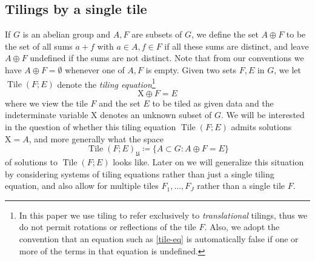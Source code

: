 \documentclass[reqno,a4paper,12pt]{amsart}
\numberwithin{equation}{section}
\numberwithin{figure}{section}
\newcommand\X{\mathrm{X}}
\newcommand{\Tile}{\operatorname{Tile}}
\newcommand{\Universe}{{\mathfrak{U}}}
\theoremstyle{plain}
\theoremstyle{definition}
\begin{document}
\subsection{Tilings by a single tile}

If $G$ is an abelian group and $A,F$ are subsets of $G$, we define the set $A \oplus F$ to be the set of all sums $a+f$ with $a \in A, f \in F$ if all these sums are distinct, and leave $A \oplus F$ undefined if the sums are not distinct.  Note that from our conventions we have $A \oplus F = \emptyset$ whenever one of $A,F$ is empty.  Given two sets $F, E$ in $G$, we let $\Tile(F; E)$ denote the \emph{tiling equation}\footnote{In this paper we use tiling to refer exclusively to \emph{translational} tilings, thus we do not permit rotations or reflections of the tile $F$. Also, we adopt the convention that an equation such as \eqref{tile-eq} is automatically false if one or more of the terms in that equation is undefined.}
\begin{equation}\label{tile-eq}
\X \oplus F = E
\end{equation}
where we view the tile $F$ and the set $E$ to be tiled as given data and the indeterminate variable $\X$ denotes an unknown subset of $G$.  We will be interested in the question of whether this tiling equation $\Tile(F;E)$ admits solutions $\X = A$, and more generally what the space 
$$ \Tile(F;E)_{\Universe} \coloneqq \{ A \subset G: A \oplus F = E \}$$ 
of solutions to $\Tile(F;E)$ looks like.  Later on we will generalize this situation by considering systems of tiling equations rather than just a single tiling equation, and also allow for multiple tiles $F_1,\dots,F_J$ rather than a single tile $F$.
\end{document}
